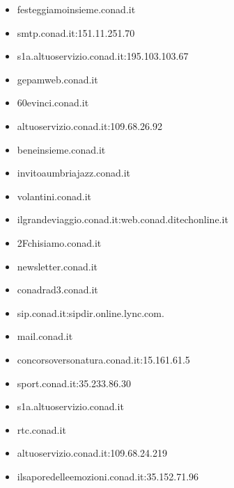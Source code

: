 \documentclass{article}
\begin{document}
\begin{itemize}
        \item festeggiamoinsieme.conad.it
    
        \item smtp.conad.it:151.11.251.70
    
        \item s1a.altuoservizio.conad.it:195.103.103.67
    
        \item gepamweb.conad.it
    
        \item 60evinci.conad.it
    
        \item altuoservizio.conad.it:109.68.26.92
    
        \item beneinsieme.conad.it
    
        \item invitoaumbriajazz.conad.it
    
        \item volantini.conad.it
    
        \item ilgrandeviaggio.conad.it:web.conad.ditechonline.it
    
        \item 2Fchisiamo.conad.it
    
        \item newsletter.conad.it
    
        \item conadrad3.conad.it
    
        \item sip.conad.it:sipdir.online.lync.com.
    
        \item mail.conad.it
    
        \item concorsoversonatura.conad.it:15.161.61.5
    
        \item sport.conad.it:35.233.86.30
    
        \item s1a.altuoservizio.conad.it
    
        \item rtc.conad.it
    
        \item altuoservizio.conad.it:109.68.24.219
    
        \item ilsaporedelleemozioni.conad.it:35.152.71.96
    

\end{itemize}
\end{document}

